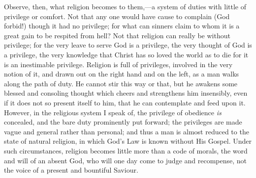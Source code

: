 Observe, then, what religion becomes to them,—a system of duties
with little of privilege or comfort. Not that any one would have cause
to complain (God forbid!) though it had no privilege; for what can
sinners claim to whom it is a great gain to be respited from hell? Not
that religion can really be without privilege; for the very leave to
serve God is a privilege, the very thought of God is a privilege, the
very knowledge that Christ has so loved the world as to die for it is
an inestimable privilege. Religion is full of privileges, involved in
the very notion of it, and drawn out on the right hand and on the
left, as a man walks along the path of duty. He cannot stir this way
or that, but he awakens some blessed and consoling thought which
cheers and strengthens him insensibly, even if it does not so present
itself to him, that he can contemplate and feed upon it. However, in
the religious system I speak of, the privilege of obedience \emph{is}
concealed, and the bare duty prominently put forward; the privileges
are made vague and general rather than personal; and thus a man is
almost reduced to the state of natural religion, in which God's Law is
known without His Gospel. Under such circumstances, religion becomes
little more than a code of morals, the word and will of an absent God,
who will one day come to judge and recompense, not the voice of a
present and bountiful Saviour.


